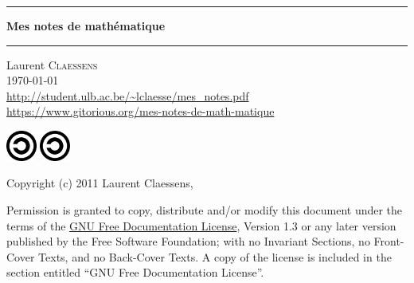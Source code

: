 \thispagestyle{empty}
\begin{center}
  \begin{minipage}{15cm}
    \hrule\par
    \vspace{2mm}
    \begin{center}
    \Huge \bfseries Mes notes de mathématique \par
    \end{center}
    \hrule\par
  \end{minipage}
\end{center}

\vspace{2cm}

\begin{center}
    Laurent \textsc{Claessens}\\
    \today\\
    \url{http://student.ulb.ac.be/~lclaesse/mes_notes.pdf}\\
    \url{https://www.gitorious.org/mes-notes-de-math-matique}
\end{center}

\vfill

\begin{center}

           \ifpdf
            \includegraphics[width=1cm]{Copyleft.svg}
        \else
            \includegraphics[width=1cm]{Copyleft.eps}
        \fi

Copyright (c) 2011  Laurent Claessens,

Permission is granted to copy, distribute and/or modify this document under the terms of the \href{http://www.gnu.org/licenses/fdl-1.3.html}{GNU Free Documentation License}, Version 1.3 or any later version published by the Free Software Foundation; with no Invariant Sections, no Front-Cover Texts, and no Back-Cover Texts. A copy of the license is included in the section entitled ``GNU Free Documentation License''.




\end{center}

\clearpage

